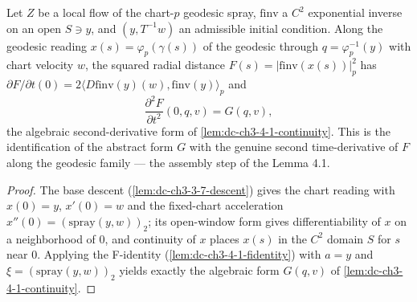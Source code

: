 \begin{lemma}
  \label{lem:dc-ch3-4-1-flowreading}
  \leanok
  Let $Z$ be a local flow of the chart-$p$ geodesic spray, $\mathrm{finv}$ a $C^2$ exponential
  inverse on an open $S\ni y$, and $(y,T^{-1}w)$ an admissible initial condition. Along the
  geodesic reading $x(s)=\varphi_p(\gamma(s))$ of the geodesic through $q=\varphi_p^{-1}(y)$
  with chart velocity $w$, the squared radial distance $F(s)=|\mathrm{finv}(x(s))|_p^2$ has
  $\partial F/\partial t(0)=2\langle D\mathrm{finv}(y)(w),\mathrm{finv}(y)\rangle_p$ and
  $$\frac{\partial^2 F}{\partial t^2}(0,q,v)=G(q,v),$$
  the algebraic second-derivative form of \cref{lem:dc-ch3-4-1-continuity}. This is the
  identification of the abstract form $G$ with the genuine second time-derivative of $F$ along
  the geodesic family — the assembly step of the Lemma 4.1.
\end{lemma}
\begin{proof}
  \sketch
  \leanok
  The base descent (\cref{lem:dc-ch3-3-7-descent}) gives the chart reading with $x(0)=y$,
  $x'(0)=w$ and the fixed-chart acceleration $x''(0)=(\mathrm{spray}(y,w))_2$; its open-window
  form gives differentiability of $x$ on a neighborhood of $0$, and continuity of $x$ places
  $x(s)$ in the $C^2$ domain $S$ for $s$ near $0$. Applying the F-identity
  (\cref{lem:dc-ch3-4-1-fidentity}) with $a=y$ and $\xi=(\mathrm{spray}(y,w))_2$ yields exactly
  the algebraic form $G(q,v)$ of \cref{lem:dc-ch3-4-1-continuity}.
\end{proof}

